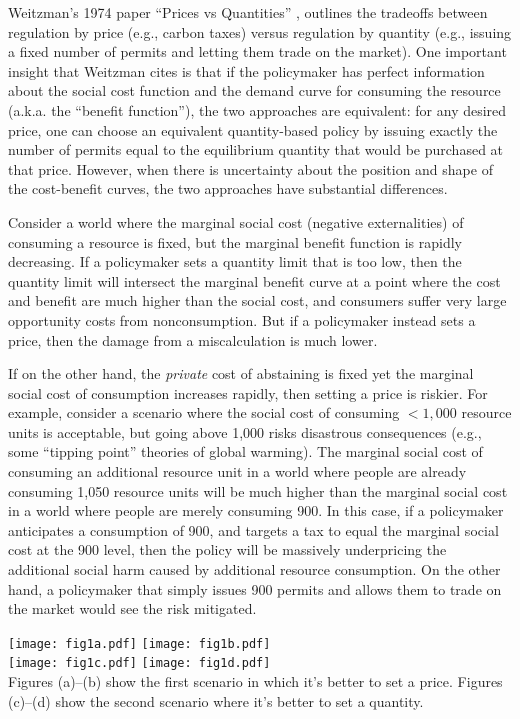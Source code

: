 \documentclass[12pt, final]{article}
\begin{document}
Weitzman's 1974 paper ``Prices vs Quantities'' \cite{weitzman1974prices}, outlines the tradeoffs between regulation by price (e.g., carbon taxes) versus regulation by quantity (e.g., issuing a fixed number of permits and letting them trade on the market). One important insight that Weitzman cites is that if the policymaker has perfect information about the social cost function and the demand curve for consuming the resource (a.k.a. the ``benefit function''), the two approaches are equivalent: for any desired price, one can choose an equivalent quantity-based policy by issuing exactly the number of permits equal to the equilibrium quantity that would be purchased at that price. However, when there is uncertainty about the position and shape of the cost-benefit curves, the two approaches have substantial differences.

Consider a world where the marginal social cost (negative externalities) of consuming a resource is fixed, but the marginal benefit function is rapidly decreasing. If a policymaker sets a quantity limit that is too low, then the quantity limit will intersect the marginal benefit curve at a point where the cost and benefit are much higher than the social cost, and consumers suffer very large opportunity costs from nonconsumption.  But if a policymaker instead sets a price, then the damage from a miscalculation is much lower.

If on the other hand, the \emph{private} cost of abstaining is fixed yet the marginal social cost of consumption increases rapidly, then setting a price is riskier. For example, consider a scenario where the social cost of consuming $<1,000$ resource units is acceptable, but going above 1,000 risks disastrous consequences (e.g., some ``tipping point'' theories of global warming\cite{wiki:runaway}). The marginal social cost of consuming an additional resource unit in a world where people are already consuming 1,050 resource units will be much higher than the marginal social cost in a world where people are merely consuming 900. In this case, if a policymaker anticipates a consumption of 900, and targets a tax to equal the marginal social cost at the 900 level, then the policy will be massively underpricing the additional social harm caused by additional resource consumption. On the other hand, a policymaker that simply issues 900 permits and allows them to trade on the market would see the risk mitigated.

\begin{center}
	\texttt{[image: fig1a.pdf]}
	\texttt{[image: fig1b.pdf]} \\

	\texttt{[image: fig1c.pdf]}
	\texttt{[image: fig1d.pdf]} \\
Figures (a)--(b) show the first scenario in which it's better to set a price.  Figures (c)--(d) show the second scenario where it's better to set a quantity.
\label{fig:one}
\end{center}
\end{document}
